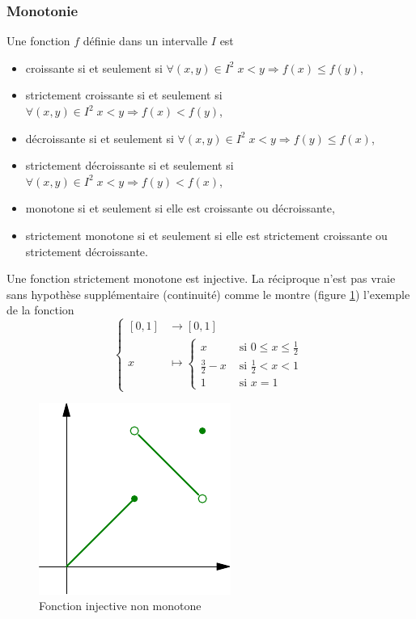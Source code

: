 \subsubsection{Monotonie}
\begin{defi}
 Une fonction $f$ définie dans un intervalle $I$ est 
\begin{itemize}
 \item croissante si et seulement si $\forall (x,y)\in I^2\; x < y \Rightarrow f(x) \leq f(y)$,
 \item strictement croissante si et seulement si $\forall (x,y)\in I^2\; x < y \Rightarrow f(x) < f(y)$,
 \item décroissante si et seulement si $\forall (x,y)\in I^2\; x < y \Rightarrow f(y) \leq f(x)$,
 \item strictement décroissante si et seulement si $\forall (x,y)\in I^2\; x < y \Rightarrow f(y) < f(x)$,
 \item monotone si et seulement si elle est croissante ou décroissante,
 \item strictement monotone si et seulement si elle est strictement croissante ou strictement décroissante.
\end{itemize}
\end{defi}
\begin{rem}
 Une fonction strictement monotone est injective. La réciproque n'est pas vraie sans hypothèse supplémentaire (continuité) comme le montre (figure \ref{fig:C2004_6}) l'exemple de la fonction
\begin{displaymath}
 \left\lbrace 
 \begin{aligned}
  \left[ 0 , 1\right] &\rightarrow \left[ 0 , 1\right]\\
  x &\mapsto
      \left\lbrace 
          \begin{aligned}
          x                &\text{ si } 0 \leq x \leq \frac{1}{2} \\
          \frac{3}{2} - x  &\text{ si } \frac{1}{2} < x < 1 \\
          1               &\text{ si } x = 1
          \end{aligned}    
      \right. 
  \end{aligned}
  \right. 
\end{displaymath}
\end{rem}
\begin{figure}[h]
 \centering
 \includegraphics{./C2004_6.pdf}
 \caption{Fonction injective non monotone}
 \label{fig:C2004_6}
\end{figure}

